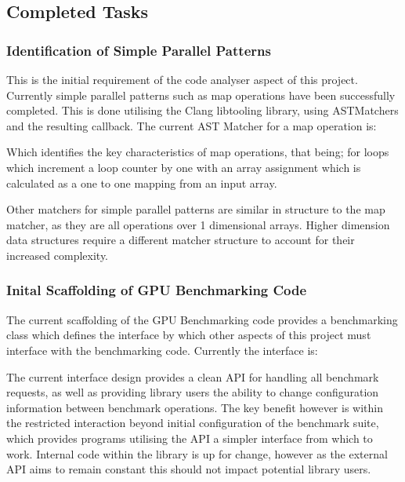 \subsection{Completed Tasks}
\subsubsection{Identification of Simple Parallel Patterns}
This is the initial requirement of the code analyser aspect of this project. Currently simple parallel patterns such as map operations have been successfully completed. This is done utilising the Clang libtooling library, using ASTMatchers and the resulting callback. The current AST Matcher for a map operation is:

Which identifies the key characteristics of map operations, that being; for loops which increment a loop counter by one with an array assignment which is calculated as a one to one mapping from an input array.

Other matchers for simple parallel patterns are similar in structure to the map matcher, as they are all operations over 1 dimensional arrays. Higher dimension data structures require a different matcher structure to account for their increased complexity.

\subsubsection{Inital Scaffolding of GPU Benchmarking Code}
The current scaffolding of the GPU Benchmarking code provides a benchmarking class which defines the interface by which other aspects of this project must interface with the benchmarking code. Currently the interface is:

The current interface design provides a clean API for handling all benchmark requests, as well as providing library users the ability to change configuration information between benchmark operations. The key benefit however is within the restricted interaction beyond initial configuration of the benchmark suite, which provides programs utilising the API a simpler interface from which to work. Internal code within the library is up for change, however as the external API aims to remain constant this should not impact potential library users.

